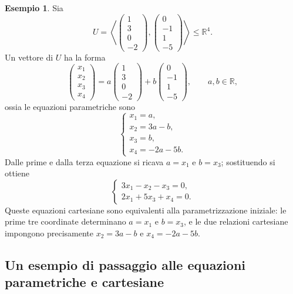 \documentclass[11pt,a4paper]{article}
\newcommand{\RR}{\mathbb{R}}
\theoremstyle{plain}
\theoremstyle{definition}
\newtheorem{esempio}[prop]{Esempio}
\theoremstyle{remark}
\begin{document}
\begin{esempio}
Sia
\[
 U=\left\langle
 \begin{pmatrix}1\\3\\0\\-2\end{pmatrix},
 \begin{pmatrix}0\\-1\\1\\-5\end{pmatrix}
 \right\rangle\leq\RR^4.
\]
Un vettore di $U$ ha la forma
\[
 \begin{pmatrix}x_1\\x_2\\x_3\\x_4\end{pmatrix}
 =a\begin{pmatrix}1\\3\\0\\-2\end{pmatrix}
 +b\begin{pmatrix}0\\-1\\1\\-5\end{pmatrix},
 \qquad a,b\in\RR,
\]
ossia le equazioni parametriche sono
\[
 \begin{cases}
 x_1=a,\\
 x_2=3a-b,\\
 x_3=b,\\
 x_4=-2a-5b.
 \end{cases}
\]
Dalle prime e dalla terza equazione si ricava $a=x_1$ e $b=x_3$; sostituendo
si ottiene
\[
 \begin{cases}
 3x_1-x_2-x_3=0,\\
 2x_1+5x_3+x_4=0.
 \end{cases}
\]
Queste equazioni cartesiane sono equivalenti alla parametrizzazione iniziale:
le prime tre coordinate determinano $a=x_1$ e $b=x_3$, e le due relazioni
cartesiane impongono precisamente $x_2=3a-b$ e $x_4=-2a-5b$.
\end{esempio}

\subsection{Un esempio di passaggio alle equazioni parametriche e cartesiane}
\end{document}
